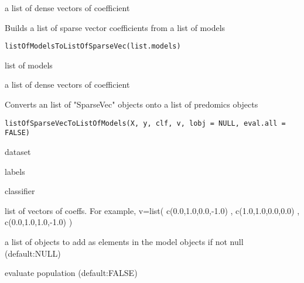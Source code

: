 \documentclass[a4paper]{book}
\begin{document}
%
\begin{Value}
a list of dense vectors of coefficient
\end{Value}
%
\begin{Description}
Builds a list of sparse vector coefficients from a list of models
\end{Description}
%
\begin{Usage}
\begin{verbatim}
listOfModelsToListOfSparseVec(list.models)
\end{verbatim}
\end{Usage}
%
\begin{Arguments}
\begin{ldescription}
\item[\code{list.models:}] list of models
\end{ldescription}
\end{Arguments}
%
\begin{Value}
a list of dense vectors of coefficient
\end{Value}
%
\begin{Description}
Converts an list of "SparseVec" objects onto a list of predomics objects
\end{Description}
%
\begin{Usage}
\begin{verbatim}
listOfSparseVecToListOfModels(X, y, clf, v, lobj = NULL, eval.all = FALSE)
\end{verbatim}
\end{Usage}
%
\begin{Arguments}
\begin{ldescription}
\item[\code{X:}] dataset

\item[\code{y:}] labels

\item[\code{clf:}] classifier

\item[\code{v:}] list of vectors of coeffs. For example, v=list( c(0.0,1.0,0.0,-1.0) , c(1.0,1.0,0.0,0.0) , c(0.0,1.0,1.0,-1.0) )

\item[\code{lobj:}] a list of objects to add as elements in the model objects if not null (default:NULL)

\item[\code{eval.all:}] evaluate population (default:FALSE)
\end{ldescription}
\end{Arguments}
\end{document}
